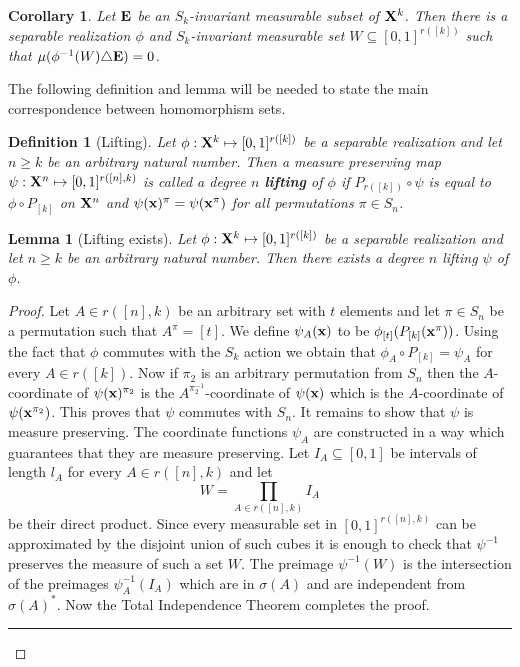 \documentclass [11pt] {article}
\newcommand{\qed} {\hspace {0.1in} \rule {1.5mm} {3.5mm}}
\newtheorem{lemma}{Lemma}[section]
\newtheorem{corollary}{Corollary}[section]
\newtheorem{definition}{Definition}[section]
\def\bE{{\bf E}}
\def\xo{{\bf X}}
\def\bbx{{\bf x}}
\begin{document}
\begin{corollary}\label{eucc2} Let $\bE$ be an $S_k$-invariant measurable
  subset of $\xo^k$. Then there is a separable realization $\phi$ and
$S_k$-invariant measurable set $W\subseteq [0,1]^{r([k])}$ such that
$\mu(\phi^{-1}(W)\triangle \bE)=0$.
\end{corollary}

The following definition and lemma will
be needed to state the main correspondence between homomorphism sets.

\begin{definition}[Lifting] Let $\phi:{\bf X}^k\mapsto [0,1]^{r([k])}$ be a
  separable realization and let
$n\geq k$ be an arbitrary natural number. Then a measure preserving map
$\psi:{\bf X}^n\mapsto[0,1]^{r([n],k)}$ is called a degree $n$ {\bf lifting} of
  $\phi$ if $P_{r([k])}\circ\psi$ is equal to $\phi\circ P_{[k]}$ on $\xo^n$
and $\psi(\bbx)^\pi=\psi(\bbx^\pi)$ for all permutations $\pi\in S_n$.
\end{definition}
\begin{lemma}[Lifting exists]\label{lifting} Let $\phi:{\bf X}^k\mapsto
  [0,1]^{r([k])}$ be a separable
realization and let $n\geq k$ be an arbitrary natural number. Then there
exists a degree $n$
lifting  $\psi$ of $\phi$.
\end{lemma}

\begin{proof} Let $A\in r([n],k)$ be an arbitrary set with $t$ elements and
  let $\pi\in S_n$ be a
permutation such that $A^\pi=[t]$. We define $\psi_A({\bf x})$ to be
$\phi_{[t]}(P_{[k]}({\bf x}^\pi))$.
Using the fact that $\phi$ commutes with the $S_k$ action we obtain that
$\phi_A\circ P_{[k]}=\psi_A$ for every $A\in r([k])$.
Now if $\pi_2$ is an arbitrary permutation from $S_n$ then the $A$-coordinate
of $\psi({\bf x})^{\pi_2}$ is the $A^{\pi_2^{-1}}$-coordinate of $\psi({\bf
  x})$ which is the $A$-coordinate of $\psi({\bf x}^{\pi_2})$.
This proves that $\psi$ commutes with $S_n$. It remains to show that $\psi$ is
measure preserving. The coordinate functions $\psi_A$
are constructed in a way which guarantees that they are measure
preserving. Let $I_A\subseteq [0,1]$ be intervals of length $l_A$
for every $A\in r([n],k)$ and let $$W=\prod_{A\in r([n],k)} I_A$$ be
their direct product. Since every measurable set
in $[0,1]^{r([n],k)}$ can be approximated by the disjoint union of such cubes
it is enough to check that $\psi^{-1}$
preserves the measure of such a set $W$. The preimage $\psi^{-1}(W)$ is the
intersection of the preimages $\psi_A^{-1}(I_A)$
which are in $\sigma(A)$ and are independent from $\sigma(A)^*$. Now the
Total Independence Theorem
completes the proof.
\qed\end{proof}
\end{document}
